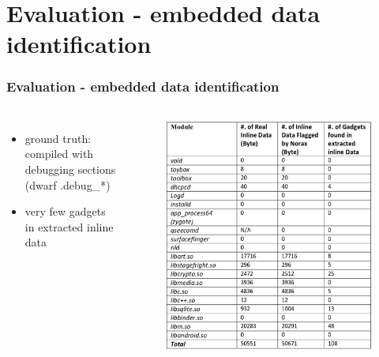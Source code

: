 \documentclass[aspectratio=169]{beamer}
\begin{document}
\section{Evaluation - embedded data identification}
\begin{frame}
\frametitle{Evaluation - embedded data identification}
\begin{columns}[c]
\begin{itemize}
\item ground truth: compiled with debugging sections (dwarf .debug\_*)
\item very few gadgets in extracted inline data
\end{itemize}
\begin{figure}
\includegraphics[width=0.8\linewidth]{figures/eval-identification.pdf}
\end{figure}
\end{columns}
\end{frame}

\end{document}
